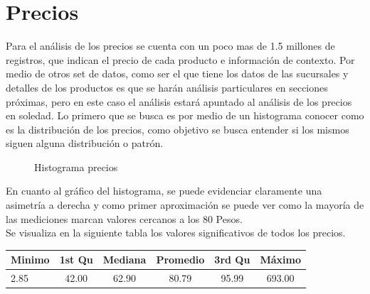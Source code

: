 \section{Precios}

Para el análisis de los precios se cuenta con un poco mas de 1.5 millones de registros, que indican el precio de cada producto e información de contexto. Por medio de otros set de datos, como ser el que tiene los datos de las sucursales y detalles de los productos es que se harán análisis particulares en secciones próximas, pero en este caso el análisis estará apuntado al análisis de los precios en soledad.
Lo primero que se busca es por medio de un histograma conocer como es la distribución de los precios, como objetivo se busca entender si los mismos siguen alguna distribución o patrón.

\begin{figure}[h]
\centering
{}%
\caption{Histograma precios}
\label{histograma}
\end{figure}


En cuanto al gráfico del histograma, se puede evidenciar claramente una asimetría a derecha y como primer aproximación se puede ver como la mayoría de las mediciones marcan valores cercanos a los 80 Pesos.\\
Se visualiza en la siguiente tabla los valores significativos de todos los precios.\\

\begin{center}
 \begin{tabular}{||l c c c c c||} 
 \hline
 Minimo & 1st Qu & Mediana & Promedio & 3rd Qu & Máximo \\ [0.5ex] 
 \hline\hline
 2.85 & 42.00 & 62.90 & 80.79 & 95.99 & 693.00 \\ 
 \hline
 \hline
\end{tabular}
\end{center}

